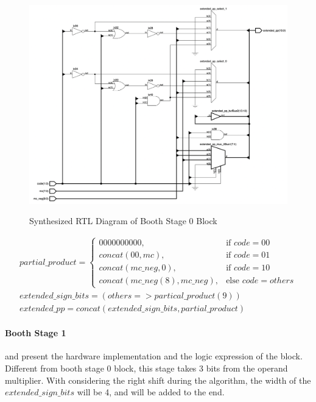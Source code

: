 \begin{figure}[!ht]
	\centering
	\caption{Synthesized RTL Diagram of Booth Stage 0 Block}
	\includegraphics[width=\textwidth]{../img/booth_stage_0_rtl.png}
	\label{fig:booth_stage_0_rtl}
\end{figure}

\begin{equation}
	\begin{array}{c}
		partial\_product =
		\begin{cases}
			0000000000,                 & \text{if } code = 00       \\
			concat(00, mc),             & \text{if } code = 01       \\
			concat(mc\_neg, 0),         & \text{if } code = 10       \\
			concat(mc\_neg(8),mc\_neg), & \text{else } code = others
		\end{cases} \\
		extended\_sign\_bits = (others => partical\_product(9))  \\
		extended\_pp = concat(extended\_sign\_bits, partial\_product)
	\end{array}
	\label{exp:booth_stage_0}
\end{equation}

\paragraph{Booth Stage 1}
 and  present the hardware implementation and the logic expression of the block.
Different from booth stage 0 block, this stage takes 3 bits from the operand multiplier.
With considering the right shift during the algorithm, the width of the \(extended\_sign\_bits\) will be 4,
and  will be added to the end.

